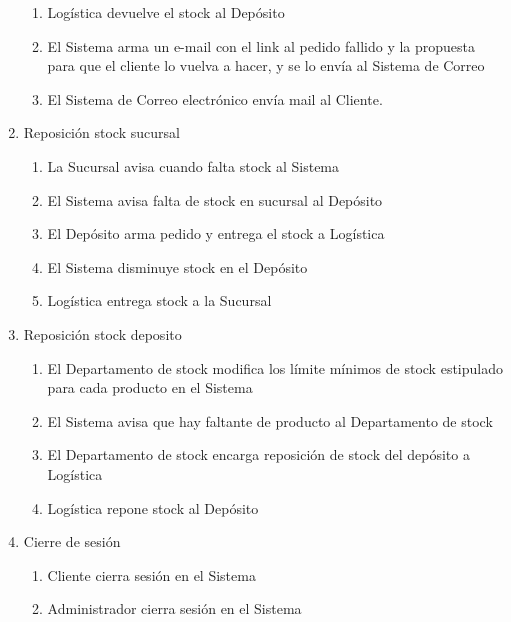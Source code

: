 \begin{enumerate}
\begin{enumerate}
    \item Logística devuelve el stock al Depósito
    \item El Sistema arma un e-mail con el link al pedido fallido y la propuesta para que el cliente lo vuelva a hacer, y se lo envía al Sistema de Correo
    \item El Sistema de Correo electrónico envía mail al Cliente.
  \end{enumerate}

\item Reposición stock sucursal
  \begin{enumerate}
    \item La Sucursal avisa cuando falta stock al Sistema
    \item El Sistema avisa falta de stock en sucursal al Depósito
    \item El Depósito arma pedido y entrega el stock a Logística
    \item El Sistema disminuye stock en el Depósito
    \item Logística entrega stock a la Sucursal
  \end{enumerate}

\item Reposición stock deposito
  \begin{enumerate}
    \item El Departamento de stock modifica los límite mínimos de stock estipulado para cada producto en el Sistema
    \item El Sistema avisa que hay faltante de producto al Departamento de stock
    \item El Departamento de stock encarga reposición de stock del depósito a Logística
    \item Logística repone stock al Depósito
  \end{enumerate}

\item Cierre de sesión
  \begin{enumerate}
    \item Cliente cierra sesión en el Sistema 
    \item Administrador	cierra sesión en el Sistema 
  \end{enumerate}
\end{enumerate}
\clearpage

